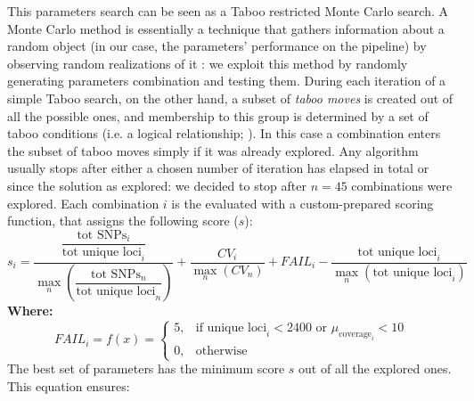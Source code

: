\documentclass[a4paper, 12pt]{report}
\begin{document}
This parameters search can be seen as a Taboo restricted Monte Carlo search. A Monte Carlo method is essentially a technique that gathers information about a random object (in our case, the parameters' performance on the pipeline) by observing random realizations of it \parencite{kroeseWhyMonteCarlo2014}: we exploit this method by randomly generating parameters combination and testing them. During each iteration of a simple Taboo search, on the other hand, a subset of \textit{taboo moves} is created out of all the possible ones, and membership to this group is determined by a set of taboo conditions (i.e. a logical relationship; \cite{gloverTabuSearchPart1989}). In this case a combination enters the subset of taboo moves simply if it was already explored. Any algorithm usually stops after either a chosen number of iteration has elapsed in total or since the solution as explored: we decided to stop after $n = 45$ combinations were explored. Each combination $i$ is the evaluated with a custom-prepared scoring function, that assigns the following score ($s$):
\begin{equation}\label{eq:score}
	s_i = 
	\frac{
		\dfrac{\text{tot SNPs}_i}{\text{tot unique loci}_i}
	}{
		\displaystyle \max_{n} \left( \dfrac{\text{tot SNPs}_n}{\text{tot unique loci}_n} \right)
	}
	+
	\frac{
		CV_i
	}{
		\displaystyle \max_{n} \left( CV_n \right)
	}
	+
	FAIL_i
	-
	\frac{
		\text{tot unique loci}_i
	}{
		\displaystyle \max_{n} \left( \text{tot unique loci}_i \right)
	}
\end{equation}
\noindent \textbf{Where:}
\begin{equation}
	FAIL_i = f(x) =
	\begin{cases}
		5, & \text{if } \text{unique loci}_i < 2400 \text{ or } \mu_{\text{coverage}_i} < 10 \\
		0, & \text{otherwise}
	\end{cases}
\end{equation}
The best set of parameters has the minimum score $s$ out of all the explored ones. This equation ensures:
\vspace{-1.5em}
\end{document}
